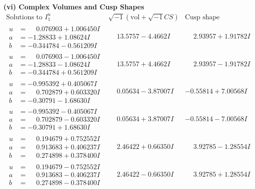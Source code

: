 \documentclass[1p]{elsarticle_modified}
\theoremstyle{definition}
\newcommand{\I}{\sqrt{-1}}
\begin{document}
\newpage\flushleft \textbf{(vi) Complex Volumes and Cusp Shapes}
$$\begin{array}{c|c|c}  
\text{Solutions to }I^u_{1}& \I (\text{vol} + \sqrt{-1}CS) & \text{Cusp shape}\\
 \hline 
\begin{aligned}
u &= \phantom{-}0.076903 + 1.006450 I \\
a &= -1.28833 + 1.08624 I \\
b &= -0.344784 - 0.561209 I\end{aligned}
 & \phantom{-}13.5757 - 4.4662 I & \phantom{-}2.93957 + 1.91782 I \\ \hline\begin{aligned}
u &= \phantom{-}0.076903 - 1.006450 I \\
a &= -1.28833 - 1.08624 I \\
b &= -0.344784 + 0.561209 I\end{aligned}
 & \phantom{-}13.5757 + 4.4662 I & \phantom{-}2.93957 - 1.91782 I \\ \hline\begin{aligned}
u &= -0.995392 + 0.405067 I \\
a &= \phantom{-}0.702879 + 0.603320 I \\
b &= -0.30791 - 1.68630 I\end{aligned}
 & \phantom{-}0.05634 - 3.87007 I & -0.55814 + 7.00568 I \\ \hline\begin{aligned}
u &= -0.995392 - 0.405067 I \\
a &= \phantom{-}0.702879 - 0.603320 I \\
b &= -0.30791 + 1.68630 I\end{aligned}
 & \phantom{-}0.05634 + 3.87007 I & -0.55814 - 7.00568 I \\ \hline\begin{aligned}
u &= \phantom{-}0.194679 + 0.752552 I \\
a &= \phantom{-}0.913683 + 0.406237 I \\
b &= \phantom{-}0.274898 + 0.378400 I\end{aligned}
 & \phantom{-}2.46422 + 0.66350 I & \phantom{-}3.92785 - 1.28554 I \\ \hline\begin{aligned}
u &= \phantom{-}0.194679 - 0.752552 I \\
a &= \phantom{-}0.913683 - 0.406237 I \\
b &= \phantom{-}0.274898 - 0.378400 I\end{aligned}
 & \phantom{-}2.46422 - 0.66350 I & \phantom{-}3.92785 + 1.28554 I \\ \hline\begin{aligned}

\end{aligned}
\end{array}$$
\end{document}
